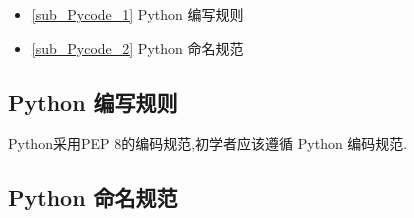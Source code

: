 
\begin{itemize}
\item \autoref{sub_Pycode_1} Python 编写规则
\item \autoref{sub_Pycode_2} Python 命名规范
\end{itemize}

\subsection{Python 编写规则}\label{sub_Pycode_1}

Python采用PEP 8的编码规范,初学者应该遵循 Python 编码规范.

\subsection{Python 命名规范}\label{sub_Pycode_2}



